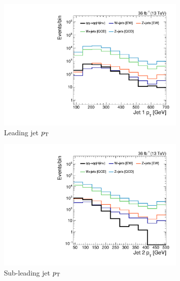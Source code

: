 \begin{figure}[]
    \begin{center}
        \begin{subfigure}[t]{0.32\textwidth}
            \includegraphics[width=\textwidth]{figures/vbf/shapes/loosesignal_jotPt_0__logy.pdf}
            \caption{Leading jet $p_\mathrm{T}$}
        \end{subfigure}
        \begin{subfigure}[t]{0.32\textwidth}
            \includegraphics[width=\textwidth]{figures/vbf/shapes/loosesignal_jotPt_1__logy.pdf}
            \caption{Sub-leading jet $p_\mathrm{T}$}
        \end{subfigure}
        \begin{subfigure}[t]{0.32\textwidth}

\end{subfigure}
\end{center}
\end{figure}
